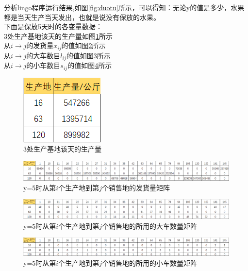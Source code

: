 \documentclass{article}
\begin{document}
    分析lingo程序运行结果,如图\ref{fig:duotu}所示，可以得知：无论y的值是多少，水果都是当天生产当天发出，也就是说没有保放的水果。\\
    下面是保放5天时的各变量数据：\\
    3处生产基地该天的生产量如图\ref{fig:shengchanliang}所示\\
	从$i\rightarrow j$的发货量$x_{i j}$的值如图\ref{fig:xij2}所示\\
	从$i\rightarrow j$的大车数目$l_{i j}$的值如图\ref{fig:lij2}所示\\
	从$i\rightarrow j$的小车数目$s_{i j}$的值如图\ref{fig:sij2}所示\\
	\begin{figure}[H]%
		\centering
		\includegraphics[width=0.25\linewidth]{img/shengchanliang.png}
		\caption{3处生产基地该天的生产量}
		\label{fig:shengchanliang}
	\end{figure}
	\begin{figure}[H]%
		\centering
		\includegraphics[width=1.0\linewidth]{img/xij2.png}
		\caption{y=5时从第$i$个生产地到第$j$个销售地的发货量矩阵}
		\label{fig:xij2}
	\end{figure}
	
	\begin{figure}[H]
		\centering
		\includegraphics[width=1.0\linewidth]{img/lij2.png}
		\caption{y=5时从第$i$个生产地到第$j$个销售地的所用的大车数量矩阵}
		\label{fig:lij2}
	\end{figure}
	
	\begin{figure}[H]
		\centering
		\includegraphics[width=1.0\linewidth]{img/sij2.png}
		\caption{y=5时从第$i$个生产地到第$j$个销售地的所用的小车数量矩阵}
		\label{fig:sij2}
	\end{figure}
	
\end{document}
